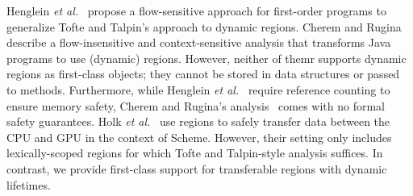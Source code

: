 Henglein \emph{et al.}~\cite{HMN01} propose a flow-sensitive approach
for first-order programs to generalize Tofte and Talpin's approach to
dynamic regions. Cherem and Rugina~\cite{CR04} describe a
flow-insensitive and context-sensitive analysis that transforms Java
programs to use (dynamic) regions.  However, neither of themr supports
dynamic regions as first-class objects; they cannot be stored in data
structures or passed to methods. Furthermore, while Henglein \emph{et
al.}~\cite{HMN01} require reference counting to ensure memory safety,
Cherem and Rugina's analysis~\cite{CR04} comes with no formal safety
guarantees.
%
Holk \emph{et al.}~\cite{gpu14} use regions to safely transfer data
between the CPU and GPU in the context of Scheme. However, their
setting only includes lexically-scoped regions for which Tofte and
Talpin-style analysis suffices. In contrast, we provide first-class
support for transferable regions with dynamic lifetimes.
